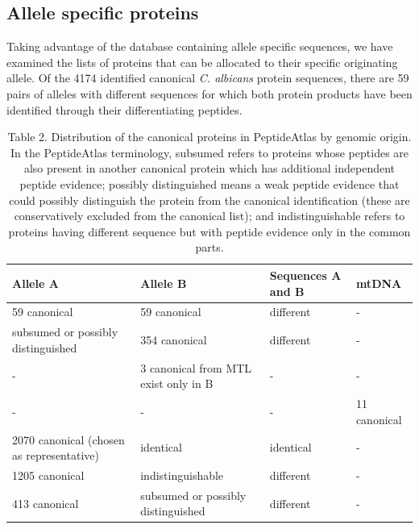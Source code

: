 \subsection*{Allele specific proteins}

Taking advantage of the database containing allele specific sequences, we have examined
the lists of proteins that can be allocated to their specific originating allele.
Of the 4174 identified canonical \textit{C. albicans} protein sequences, there are 59 pairs of alleles
with different sequences for which both protein products have been identified through their
differentiating peptides.

\begin{table}[t]
\renewcommand{\arraystretch}{2}
\footnotesize
\centering
\begin{tabular}{p{2cm} p{2.5cm} p{2.5cm} p{2cm} }
\hline
Allele A  & Allele B & Sequences A and B & mtDNA \\
\hline
59 canonical & 59 canonical & different & -\\
subsumed or \newline possibly distinguished & 354 canonical & different & -\\
- & 3 canonical from MTL \newline exist only in B & - & -\\
- & - & - & 11 canonical \\
2070 canonical \newline (chosen as representative) & identical & identical & - \\
1205 canonical & indistinguishable & different & - \\
413 canonical & subsumed or \newline possibly distinguished & different & - \\

\end{tabular}
\caption*{Table 2. Distribution of the canonical proteins in PeptideAtlas by genomic origin. In the
PeptideAtlas terminology, subsumed refers to proteins whose peptides are also present in another
canonical protein which has additional independent peptide evidence; possibly distinguished
means a weak peptide evidence that could possibly distinguish the protein from the canonical
identification (these are conservatively excluded from the canonical list); and indistinguishable
refers to proteins having different sequence but with peptide evidence only in the common parts.}
\end{table}


